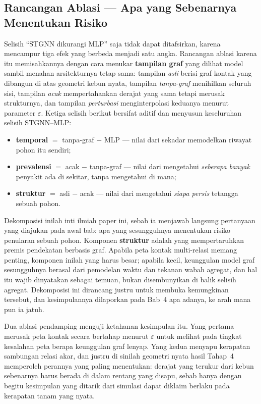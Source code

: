 \subsection{Rancangan Ablasi --- Apa yang Sebenarnya Menentukan Risiko}

Selisih ``STGNN dikurangi MLP'' saja tidak dapat ditafsirkan, karena mencampur tiga efek
yang berbeda menjadi satu angka. Rancangan ablasi karena itu memisahkannya dengan cara
menukar \textbf{tampilan graf} yang dilihat model sambil menahan arsitekturnya tetap sama:
tampilan \textit{asli} berisi graf kontak yang dibangun di atas geometri kebun nyata,
tampilan \textit{tanpa-graf} menihilkan seluruh sisi, tampilan \textit{acak}
mempertahankan derajat yang sama tetapi merusak strukturnya, dan tampilan
\textit{perturbasi} menginterpolasi keduanya menurut parameter $\varepsilon$. Ketiga
selisih berikut bersifat aditif dan menyusun keseluruhan selisih STGNN--MLP:

\begin{itemize}\itemsep2pt
  \item \textbf{temporal} $=$ tanpa-graf $-$ MLP --- nilai dari sekadar memodelkan
        riwayat pohon itu sendiri;
  \item \textbf{prevalensi} $=$ acak $-$ tanpa-graf --- nilai dari mengetahui
        \textit{seberapa banyak} penyakit ada di sekitar, tanpa mengetahui di mana;
  \item \textbf{struktur} $=$ asli $-$ acak --- nilai dari mengetahui \textit{siapa
        persis} tetangga sebuah pohon.
\end{itemize}

Dekomposisi inilah inti ilmiah paper ini, sebab ia menjawab langsung pertanyaan yang
diajukan pada awal bab: apa yang sesungguhnya menentukan risiko penularan sebuah pohon.
Komponen \textbf{struktur} adalah yang mempertaruhkan premis pendekatan berbasis graf.
Apabila peta kontak multi-relasi memang penting, komponen inilah yang harus besar;
apabila kecil, keunggulan model graf sesungguhnya berasal dari pemodelan waktu dan
tekanan wabah agregat, dan hal itu wajib dinyatakan sebagai temuan, bukan disembunyikan
di balik selisih agregat. Dekomposisi ini dirancang justru untuk membuka kemungkinan
tersebut, dan kesimpulannya dilaporkan pada Bab~4 apa adanya, ke arah mana pun ia jatuh.

Dua ablasi pendamping menguji ketahanan kesimpulan itu. Yang pertama merusak peta kontak
secara bertahap menurut $\varepsilon$ untuk melihat pada tingkat kesalahan peta berapa
keunggulan graf lenyap. Yang kedua menyapu kerapatan sambungan relasi akar, dan justru di
sinilah geometri nyata hasil Tahap~4 memperoleh perannya yang paling menentukan: derajat
yang terukur dari kebun sebenarnya harus berada di dalam rentang yang disapu, sebab hanya
dengan begitu kesimpulan yang ditarik dari simulasi dapat diklaim berlaku pada kerapatan
tanam yang nyata.
